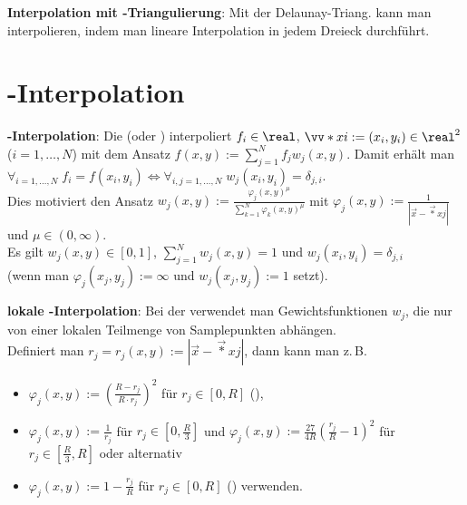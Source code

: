 \textbf{Interpolation mit -Triangulierung}:
Mit der Delaunay-Triang. kann man interpolieren,
indem man lineare Interpolation in jedem Dreieck durchführt.

\section{%
    -Interpolation%
}

\textbf{-Interpolation}:
Die  (oder )
interpoliert $f_i \in \real$, $\vec*{x}{i} := (x_i, y_i) \in \real^2$ ($i = 1, \dotsc, N$)
mit dem Ansatz $f(x, y) := \sum_{j=1}^N f_j w_j(x, y)$.
Damit erhält man $\forall_{i=1,\dotsc,N}\; f_i = f(x_i, y_i) \iff
\forall_{i,j=1,\dotsc,N}\; w_j(x_i, y_i) = \delta_{j,i}$.\\
Dies motiviert den Ansatz
$w_j(x, y) := \frac{\varphi_j(x, y)^\mu}{\sum_{k=1}^N \varphi_k(x, y)^\mu}$ mit
$\varphi_j(x, y) := \frac{1}{|\vec{x} - \vec*{x}{j}|}$ und $\mu \in (0, \infty)$.\\
Es gilt $w_j(x, y) \in [0, 1]$, $\sum_{j=1}^N w_j(x, y) = 1$ und $w_j(x_i, y_i) = \delta_{j,i}$\\
(wenn man $\varphi_j(x_j, y_j) := \infty$ und $w_j(x_j, y_j) := 1$ setzt).

\linie

\textbf{lokale -Interpolation}:
Bei der  verwendet man
Gewichtsfunktionen $w_j$, die nur von einer lokalen Teilmenge von Samplepunkten abhängen.\\
Definiert man $r_j = r_j(x, y) := |\vec{x} - \vec*{x}{j}|$, dann
kann man z.\,B.
\begin{itemize}
    \item
    $\varphi_j(x, y) := \left(\frac{R - r_j}{R \cdot r_j}\right)^2$ für $r_j \in [0, R]$
    (),

    \item
    $\varphi_j(x, y) := \frac{1}{r_j}$ für $r_j \in [0, \frac{R}{3}]$ und
    $\varphi_j(x, y) := \frac{27}{4R} \left(\frac{r_j}{R} - 1\right)^2$ für
    $r_j \in [\frac{R}{3}, R]$ oder alternativ

    \item
    $\varphi_j(x, y) := 1 - \frac{r_j}{R}$ für $r_j \in [0, R]$
    () verwenden.
\end{itemize}

